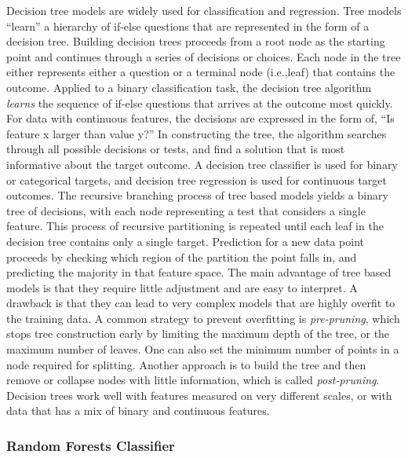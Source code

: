 \documentclass[sigconf]{acmart}
\begin{document}
Decision tree models are widely used for classification and regression. Tree 
models ``learn'' a hierarchy of if-else questions that are represented in the
form of a decision tree. Building decision trees proceeds from a root node as 
the starting point and continues through a series of decisions or choices.
Each node in the tree either represents either a question or a terminal node 
(i.e.,leaf) that contains the outcome. Applied to a binary classification task, 
the decision tree algorithm \emph{learns} the sequence of if-else questions that 
arrives at the outcome most quickly. For data with continuous features, the 
decisions are expressed in the form of, ``Is feature x larger than value y?''
\cite{muller17} In constructing the tree, the algorithm searches through all
possible decisions or tests, and find a solution that is most informative 
about the target outcome. A decision tree classifier is used for binary or 
categorical targets, and decision tree regression is used for continuous
target outcomes. The recursive branching process of tree based models yields
a binary tree of decisions, with each node representing a test that considers
a single feature. This process of recursive partitioning is repeated until
each leaf in the decision tree contains only a single target. Prediction for
a new data point proceeds by checking which region of the partition the 
point falls in, and predicting the majority in that feature space. The 
main advantage of tree based models is that they require little adjustment 
and are easy to interpret. A drawback is that they can lead to very complex
models that are highly overfit to the training data. A common strategy to 
prevent overfitting is \emph{pre-pruning}, which stops tree construction 
early by limiting the maximum depth of the tree, or the maximum number of 
leaves. One can also set the minimum number of points in a node required for 
splitting. Another approach is to build the tree and then remove or collapse 
nodes with little information, which is called \emph{post-pruning}. Decision
trees work well with features measured on very different scales, or with 
data that has a mix of binary and continuous features. 

\subsubsection{Random Forests Classifier}
\end{document}
